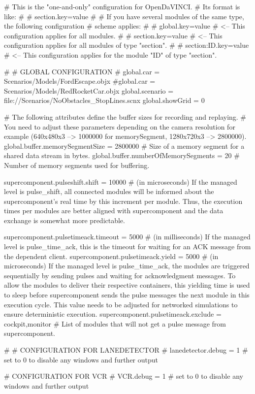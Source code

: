 # This is the "one-and-only" configuration for OpenDaVINCI.
# Its format is like:
#
# section.key=value
#
# If you have several modules of the same type, the following configuration
# scheme applies:
#
# global.key=value # <-- This configuration applies for all modules.
#
# section.key=value # <-- This configuration applies for all modules of type "section".
#
# section:ID.key=value # <-- This configuration applies for the module "ID" of type "section".

#
# GLOBAL CONFIGURATION
#
global.car = Scenarios/Models/FordEscape.objx
#global.car = Scenarios/Models/RedRocketCar.objx
global.scenario = file://Scenarios/NoObstacles_StopLines.scnx
global.showGrid = 0

# The following attributes define the buffer sizes for recording and replaying.
# You need to adjust these parameters depending on the camera resolution for example (640x480x3 --> 1000000 for memorySegment, 1280x720x3 --> 2800000).
global.buffer.memorySegmentSize = 2800000 # Size of a memory segment for a shared data stream in bytes.
global.buffer.numberOfMemorySegments = 20 # Number of memory segments used for buffering.

supercomponent.pulseshift.shift = 10000 # (in microseconds) If the managed level is pulse_shift, all connected modules will be informed about the supercomponent's real time by this increment per module. Thus, the execution times per modules are better aligned with supercomponent and the data exchange is somewhat more predictable.

supercomponent.pulsetimeack.timeout = 5000 # (in milliseconds) If the managed level is pulse_time_ack, this is the timeout for waiting for an ACK message from the dependent client.
supercomponent.pulsetimeack.yield = 5000 # (in microseconds) If the managed level is pulse_time_ack, the modules are triggered sequentially by sending pulses and waiting for acknowledgment messages. To allow the modules to deliver their respective containers, this yielding time is used to sleep before supercomponent sends the pulse messages the next module in this execution cycle. This value needs to be adjusted for networked simulations to ensure deterministic execution. 
supercomponent.pulsetimeack.exclude = cockpit,monitor # List of modules that will not get a pulse message from supercomponent.


#
# CONFIGURATION FOR LANEDETECTOR
#
lanedetector.debug = 1      # set to 0 to disable any windows and further output


# CONFIGURATION FOR VCR
#
VCR.debug = 1      # set to 0 to disable any windows and further output


